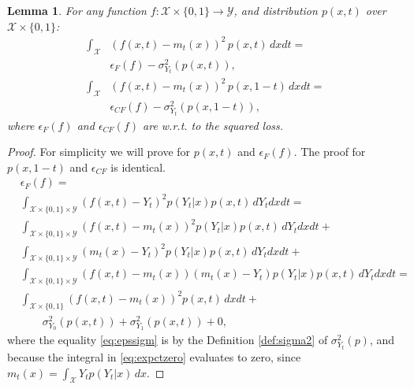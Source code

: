 \documentclass{article}
\newtheorem{thmapplem}{Lemma}
\def\cX{\mathcal X}
\def\cY{\mathcal Y}
\begin{document}
\begin{thmapplem}\label{lem:epsmloss}
For any function $f : \cX \times \{0,1\} \rightarrow \cY$, and distribution $p(x,t)$ over $\cX \times \{0,1\}$:
\begin{align*}
\int_\cX& \left(f(x,t) - m_t(x) \right)^2 \, p(x,t) \, dx dt = \\
&\epsilon_F(f) - \sigma^2_{Y_t}(p(x,t)), \\
 \int_\cX &\left(f(x,t) - m_t(x) \right)^2 \, p(x,1-t) \, dx dt = \\
& \epsilon_{CF}(f) - \sigma^2_{Y_t}(p(x,1-t)),
\end{align*}
where $\epsilon_F(f)$ and $\epsilon_{CF}(f)$ are w.r.t. to the squared loss.
\end{thmapplem}
\begin{proof}
For simplicity we will prove for $p(x,t)$ and $\epsilon_F(f)$. The proof for $p(x,1-t)$ and $\epsilon_{CF}$ is identical.
\begin{align}
&\epsilon_F(f) = \nonumber \\
&\int_{\cX  \times \{0,1\} \times \cY}   \!\!\!\!\!\!\!\!\!\!\!\!\!\!\!\!\!\!\!\!\!\! \left(f(x,t) - Y_t\right)^2 p(Y_t|x) p(x,t) \, dY_t dx dt = \nonumber \\
&\int_{\cX  \times \{0,1\} \times \cY}   \!\!\!\!\!\!\!\!\!\!\!\!\!\!\!\!\!\!\!\!\!\! \left(f(x,t) - m_t(x)\right)^2 p(Y_t|x) p(x,t) \, dY_t dx dt + \nonumber \\
&\int_{\cX  \times \{0,1\} \times \cY}   \!\!\!\!\!\!\!\!\!\!\!\!\!\!\!\!\!\!\!\!\!\!  \left(m_t(x) - Y_t\right)^2 p(Y_t|x) p(x,t) \, dY_t dx dt + \label{eq:expctzero} \\
&\int_{\cX  \times \{0,1\} \times \cY}  \!\!\!\!\!\!\!\!\!\!\!\!\!\!\!\!\!\!\!\!\!\! \left(f(x,t) - m_t(x)\right)\left(m_t(x) - Y_t\right) p(Y_t|x) p(x,t) \, dY_t dx dt = \label{eq:epssigm} \\
&\int_{\cX  \times \{0,1\} }   \!\!\!\!\!\!\!\!\!\!\!\!\!\!\!\!\!\! \left(f(x,t) - m_t(x)\right)^2  p(x,t) \,  dx dt + \nonumber \\
&\quad \quad \sigma^2_{Y_0}(p(x,t)) + \sigma^2_{Y_1}(p(x,t)) +0 , \nonumber
\end{align}
where the equality \eqref{eq:epssigm} is by the Definition \ref{def:sigma2} of $\sigma^2_{Y_t}(p)$, and because the integral in \eqref{eq:expctzero} evaluates to zero, since $m_t(x) = \int_\cX Y_t p(Y_t|x) \, dx$.
\end{proof}
\end{document}
